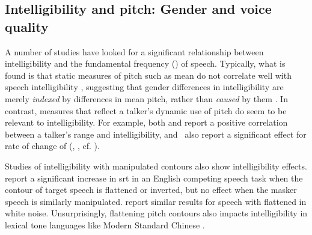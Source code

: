 


\subsection[Intelligibility and pitch]{Intelligibility and pitch: Gender and voice quality\label{sec:IntelPitch}}
A number of studies have looked for a significant relationship between intelligibility and the fundamental frequency (\fo) of speech.  Typically, what is found is that static measures of pitch such as mean \fo{} do not correlate well with speech intelligibility \citep[\eg,][]{PichenyEtAl1986, BradlowEtAl1996, HazanMarkham2004, LuCooke2009}, suggesting that gender differences in intelligibility are merely {\em indexed} by differences in mean pitch, rather than {\em caused} by them \citep[cf. discussion in][]{BradlowEtAl1996}.  In contrast, measures that reflect a talker’s dynamic use of pitch do seem to be relevant to intelligibility.  For example, both \citet{BradlowEtAl1996} and \citet{McCloyEtAl2013} report a positive correlation between a talker’s \fo{} range and intelligibility, and \citeauthor*{McCloyEtAl2013}\ also report a significant effect for rate of change of \fo{} (\aka, , cf. \citealt{GauthierEtAl2007b, GauthierEtAl2007a, GauthierEtAl2009}). %

Studies of intelligibility with manipulated \fo{} contours also show intelligibility effects.  \citet{BinnsCulling2007} report a significant increase in \ac{srt} in an English competing speech task when the \fo{} contour of target speech is flattened or inverted, but no effect when the masker speech is similarly manipulated.  \citet{WatsonSchlauch2008} report similar results for speech with flattened \fo{} in white noise.  Unsurprisingly, flattening pitch contours also impacts intelligibility in lexical tone languages like Modern Standard Chinese \citep{PatelEtAl2010}.

